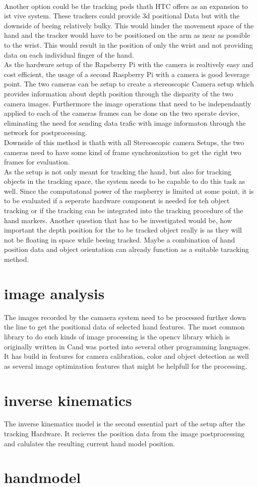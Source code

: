 \\Another option could be the tracking  pods thath HTC offers as an expansion to ist vive system. These trackers could provide 3d positional Data but with the downside of beeing relatively bulky. This would hinder the movement space of the hand and the tracker would have to be positioned on the arm as near as possible to the wrist. This would result in the position of only the wrist and not providing data on each individual finger of the hand.\\
As the hardware setup of the Rapsberry Pi with the camera is realtively easy and cost efficient, the usage of a second Raspberry Pi with a camera is good leverage point. The two cameras can be setup to create a stereoscopic Camera setup which provides information about depth position through the disparity of the two camera images. 
Furthermore  the image operations that need to be independantly applied to each of the cameras frames can be done on the two sperate device, eliminating the need for sending data trafic with image informaton through the network for postprocessing.
\\Downside of this method is thath with all Stereoscopic camera Setups, the two cameras need to have some kind of frame synchronization to get the right two frames for evaluation.
\\As the setup is not only meant for tracking the hand, but also for tracking objects in the tracking space, the system needs to be capable to do this task as well. Since the computatonal power of the raspberry is limited at some point, it is to be evaluated if a seperate hardware component is needed for teh object tracking or if the tracking can be integrated into the tracking procedure of the hand markers. Another question that has to be investigated would be, how important the depth position for the to be tracked object really is as they will not be floating in space while beeing tracked. Maybe a combination of hand position data and object orientation can already function as a suitable taracking method.







\section{image analysis}
The images recorded by the camaera system need to be processed further down the line to get the positional data of selected hand features. The most common library to do such kinds of image processing is the opencv library which is originally written in Cand was ported into several other programming languages. It has build in features for camera calibration, color and object detection as well as several image optimization features that might be helpfull for the processing.
\section{inverse kinematics}
The inverse kinematics model is the second essential part of the setup after the tracking Hardware. It recieves the position data from the image postprocessing and calulates the resulting current hand model position.
\cite{Lansley.2016}
\section{handmodel}
 
